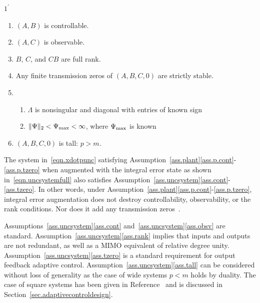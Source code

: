 \begin{customthm}{$1^{\prime}$} $\;$\label{ass.uncsystem}
  \begin{enumerate}[\Alph{enumi}), ref=\Alph{enumi}] %
    \itemsep0em
    \item{$(A,B)$ is controllable.\label{ass.cont}}
    \item{$(A,C)$ is observable.\label{ass.obsv}}
    \item{$B$, $C$, and $CB$ are full rank.\label{ass.rank}}
    \item{Any finite transmission zeros of $(A,B,C,0)$ are strictly stable.\label{ass.tzero}}
    \item{%
      \begin{enumerate}[(\alph{enumii}), ref=\alph{enumii}]
        \item{$\Lambda$ is nonsingular and diagonal with entries of known sign\label{ass.unc.lambda}}
        \item{$\|\Psi\|_{2}<\Psi_{\rm{\max}}<\infty$, where $\Psi_{\rm{\max}}$ is known\label{ass.unc.w}}
      \end{enumerate}\label{ass.unc}
    }
    \item{$(A,B,C,0)$ is tall: $p>m$.\label{ass.tall}}
  \end{enumerate}
\end{customthm}

\begin{rem-dan}
  The system in\ \eqref{eqn.xdotpunc} satisfying Assumption~\ref{ass.plant}\ref{ass.p.cont}-\ref{ass.p.tzero} when augmented with the integral error state as shown in\ \eqref{eqn.uncsystemfull} also satisfies Assumption~\ref{ass.uncsystem}\ref{ass.cont}-\ref{ass.tzero}.
  In other words, under Assumption~\ref{ass.plant}\ref{ass.p.cont}-\ref{ass.p.tzero}, integral error augmentation does not destroy controllability, observability, or the rank conditions.
  Nor does it add any transmission zeros\ \cite{lavretsky.output.2010}.
\end{rem-dan}

\begin{rem-dan}
  Assumptions~\ref{ass.uncsystem}\ref{ass.cont} and~\ref{ass.uncsystem}\ref{ass.obsv} are standard.
  Assumption~\ref{ass.uncsystem}\ref{ass.rank} implies that inputs and outputs are not redundant, as well as a MIMO equivalent of relative degree unity.
  Assumption~\ref{ass.uncsystem}\ref{ass.tzero} is a standard requirement for output feedback adaptive control.
  Assumption~\ref{ass.uncsystem}\ref{ass.tall} can be considered without loss of generality as the case of wide systems $p<m$ holds by duality.
  The case of square systems has been given in Reference\ \cite{huang.designspr.1999} and is discussed in Section~\ref{sec.adaptivecontroldesign}.
\end{rem-dan}

